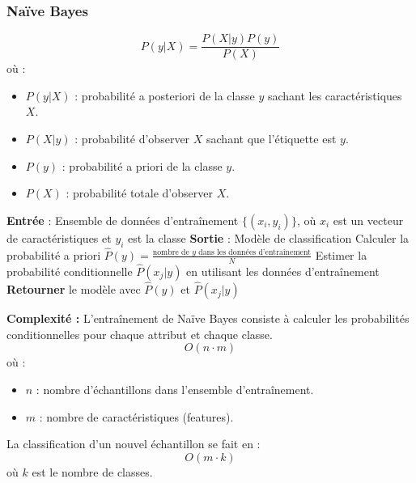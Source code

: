 \subsubsection{Naïve Bayes}
\begin{equation}
P(y|X) = \frac{P(X|y) P(y)}{P(X)}
\end{equation}
où :
\begin{itemize}
    \item[-] \( P(y|X) \) : probabilité a posteriori de la classe \( y \) sachant les caractéristiques \( X \).
    \item[-] \( P(X|y) \) : probabilité d’observer \( X \) sachant que l’étiquette est \( y \).
    \item[-] \( P(y) \) : probabilité a priori de la classe \( y \).
    \item[-] \( P(X) \) : probabilité totale d’observer \( X \).
\end{itemize}
\begin{algorithm}[H]
\caption{Naïve Bayes pour classification}
\begin{algorithmic}[1]
\State \textbf{Entrée} : Ensemble de données d'entraînement $\{(x_i, y_i)\}$, où $x_i$ est un vecteur de caractéristiques et $y_i$ est la classe
\State \textbf{Sortie} : Modèle de classification
    \State Calculer la probabilité a priori $\hat{P}(y) = \frac{\text{nombre de } y \text{ dans les données d'entraînement}}{N}$
\EndFor
{}
    \State Estimer la probabilité conditionnelle $\hat{P}(x_j | y)$ en utilisant les données d'entraînement
\EndFor
\State \textbf{Retourner} le modèle avec $\hat{P}(y)$ et $\hat{P}(x_j | y)$
\end{algorithmic}
\end{algorithm}
\textbf{Complexité :}  
L'entraînement de Naïve Bayes consiste à calculer les probabilités conditionnelles pour chaque attribut et chaque classe.  
\begin{equation}
O(n \cdot m)
\end{equation}
où :
\begin{itemize}
    \item \( n \) : nombre d'échantillons dans l'ensemble d'entraînement.
    \item \( m \) : nombre de caractéristiques (features).
\end{itemize}
La classification d’un nouvel échantillon se fait en :
\begin{equation}
O(m \cdot k)
\end{equation}
où \( k \) est le nombre de classes.

